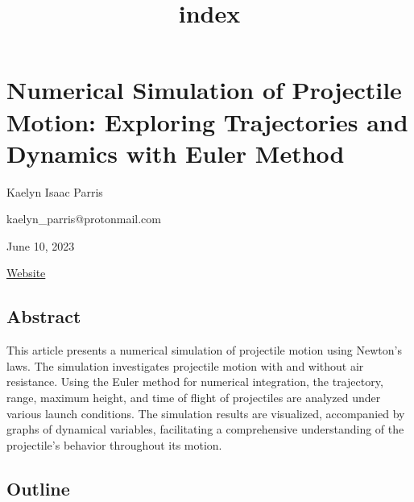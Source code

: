 \documentclass[11pt]{article}
\title{index}
\begin{document}
    
    \maketitle
    
    

    
    \hypertarget{numerical-simulation-of-projectile-motion-exploring-trajectories-and-dynamics-with-euler-method}{%
\section{Numerical Simulation of Projectile Motion: Exploring
Trajectories and Dynamics with Euler
Method}\label{numerical-simulation-of-projectile-motion-exploring-trajectories-and-dynamics-with-euler-method}}

Kaelyn Isaac Parris

kaelyn\_parris@protonmail.com

June 10, 2023

\href{https://linktr.ee/kaelyn_parris}{Website}

\hypertarget{abstract}{%
\subsection{Abstract}\label{abstract}}

This article presents a numerical simulation of projectile motion using
Newton's laws. The simulation investigates projectile motion with and
without air resistance. Using the Euler method for numerical
integration, the trajectory, range, maximum height, and time of flight
of projectiles are analyzed under various launch conditions. The
simulation results are visualized, accompanied by graphs of dynamical
variables, facilitating a comprehensive understanding of the
projectile's behavior throughout its motion.

    \hypertarget{outline}{%
\subsection{Outline}\label{outline}}
\end{document}
